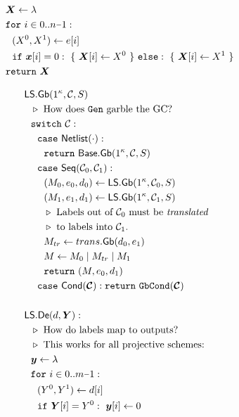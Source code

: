 \begin{figure}
\begin{adjustwidth}{-0.1\textwidth}{-0.1\textwidth}
\begin{minipage}[t]{0.56\linewidth}
\begin{align*}
      &~~\gcirinp \gets \emptystring\\
      &~~\cfor~i \in 0..n\minus 1:\\
      &~~~~(X^0, X^1) \gets e[i]\\
      &~~~~\cif~\cirinp[i] = 0:~\{~\gcirinp[i] \gets X^0~\}~\celse:~\{~\gcirinp[i] \gets X^1~\}\\
      &~~\creturn~\gcirinp
    \end{align*}
  \end{minipage}
  \begin{minipage}[t]{0.40\linewidth}
    \begin{align*}
      &\ourscheme.\gGb(1^\kappa, \cir, S)\\
      &~~\codecomment{How does \G garble the GC?}\\
      &~~\switch~\cir:\\
      &~~~~\ccase~\netlist(\cdot):\\
      &~~~~~~\creturn~\underscheme.\gGb(1^\kappa,\cir,S)\\
      &~~~~\ccase~\sequential(\cir_0, \cir_1):\\
      &~~~~~~(\mat_0, e_0, d_0) \gets \ourscheme.\gGb(1^\kappa,\cir_0, S)\\
      &~~~~~~(\mat_1, e_1, d_1) \gets \ourscheme.\gGb(1^\kappa,\cir_1, S)\\
      &~~~~~~\codecomment{Labels out of $\cir_0$ must be \emph{translated}}\\
      &~~~~~~\codecomment{to labels into $\cir_1$.}\\
      &~~~~~~\mat_{tr} \gets \gbtranslate(d_0,e_1)\\
      &~~~~~~\mat \gets \mat_0\mid \mat_{tr}\mid \mat_1\\
      &~~~~~~\creturn~(\mat, e_0, d_1)\\
      &~~~~\ccase~\conditional(\vec \cir): \creturn~\gbcond(\vec \cir)\\
      \\
      &\ourscheme.\gDe(d, \gcirout):\\
      &~~\codecomment{How do labels map to outputs?}\\
      &~~\codecomment{This works for all projective schemes:}\\
      &~~\cirout \gets \lambda\\
      &~~\cfor~i \in 0.. m\minus 1:\\
      &~~~~(Y^0, Y^1) \gets d[i]\\
      &~~~~\cif~\gcirout[i] = Y^0:~\cirout[i] \gets 0\\

\end{align*}
\end{minipage}
\end{adjustwidth}
\end{figure}
